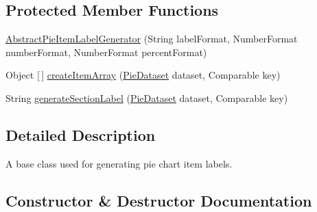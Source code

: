 \subsection*{Protected Member Functions}
\begin{DoxyCompactItemize}
\item 
\mbox{\hyperlink{classorg_1_1jfree_1_1chart_1_1labels_1_1_abstract_pie_item_label_generator_acb9acd93d6bb8c92da253b7f29db883d}{Abstract\+Pie\+Item\+Label\+Generator}} (String label\+Format, Number\+Format number\+Format, Number\+Format percent\+Format)
\item 
Object \mbox{[}$\,$\mbox{]} \mbox{\hyperlink{classorg_1_1jfree_1_1chart_1_1labels_1_1_abstract_pie_item_label_generator_a4e8f2f699263b772b5713cf290ed5814}{create\+Item\+Array}} (\mbox{\hyperlink{interfaceorg_1_1jfree_1_1data_1_1general_1_1_pie_dataset}{Pie\+Dataset}} dataset, Comparable key)
\item 
String \mbox{\hyperlink{classorg_1_1jfree_1_1chart_1_1labels_1_1_abstract_pie_item_label_generator_a0f7486688672912ead542733a119df45}{generate\+Section\+Label}} (\mbox{\hyperlink{interfaceorg_1_1jfree_1_1data_1_1general_1_1_pie_dataset}{Pie\+Dataset}} dataset, Comparable key)
\end{DoxyCompactItemize}


\subsection{Detailed Description}
A base class used for generating pie chart item labels. 

\subsection{Constructor \& Destructor Documentation}
\mbox{\label{classorg_1_1jfree_1_1chart_1_1labels_1_1_abstract_pie_item_label_generator_acb9acd93d6bb8c92da253b7f29db883d}} 
